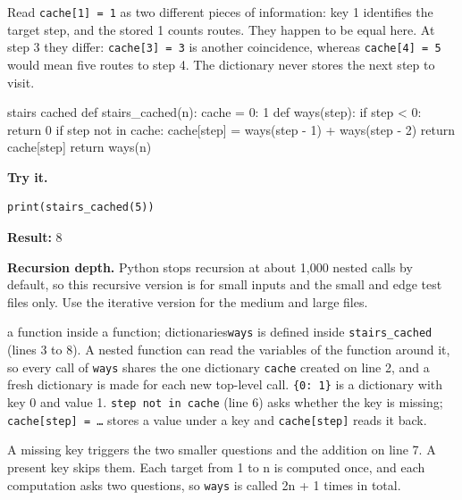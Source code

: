 \documentclass[11pt,a4paper,oneside]{report}
\begin{document}
Read \texttt{cache[1] = 1} as two different pieces of information: key 1 identifies the target step, and the stored 1 counts routes. They happen to be equal here. At step 3 they differ: \texttt{cache[3] = 3} is another coincidence, whereas \texttt{cache[4] = 5} would mean five routes to step 4. The dictionary never stores the next step to visit.

\begin{bookcode}{stairs cached}
def stairs_cached(n):
    cache = {0: 1}
    def ways(step):
        if step < 0:
            return 0
        if step not in cache:
            cache[step] = ways(step - 1) + ways(step - 2)
        return cache[step]
    return ways(n)
\end{bookcode}
\textbf{Try it.}

\begin{lstlisting}
print(stairs_cached(5))
\end{lstlisting}
\textbf{Result:} 8

\textbf{Recursion depth.} Python stops recursion at about 1,000 nested calls by default, so this recursive version is for small inputs and the small and edge test files only. Use the iterative version for the medium and large files.

\begin{pythonnote}{a function inside a function; dictionaries}\texttt{ways} is defined inside \texttt{stairs\_cached} (lines 3 to 8). A nested function can read the variables of the function around it, so every call of \texttt{ways} shares the one dictionary \texttt{cache} created on line 2, and a fresh dictionary is made for each new top-level call. \texttt{\{0: 1\}} is a dictionary with key 0 and value 1. \texttt{step not in cache} (line 6) asks whether the key is missing; \texttt{cache[step] = …} stores a value under a key and \texttt{cache[step]} reads it back.\end{pythonnote}
A missing key triggers the two smaller questions and the addition on line 7. A present key skips them. Each target from 1 to n is computed once, and each computation asks two questions, so \texttt{ways} is called 2n + 1 times in total.
\end{document}
